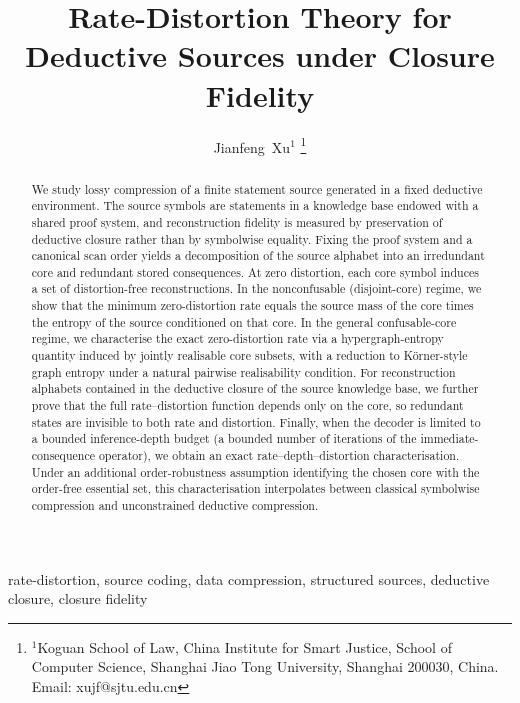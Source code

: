 \documentclass[journal,onecolumn]{IEEEtran}
\numberwithin{equation}{section}
\begin{document}
\title{Rate-Distortion Theory for Deductive Sources under Closure Fidelity}

\author{Jianfeng~Xu$^{1}$%
\thanks{$^{1}$Koguan School of Law, China Institute for Smart Justice,
School of Computer Science, Shanghai Jiao Tong University,
Shanghai 200030, China. Email: xujf@sjtu.edu.cn}%
}

\maketitle

\begin{abstract}
We study lossy compression of a finite statement source generated in a fixed deductive environment.
The source symbols are statements in a knowledge base endowed with a shared proof system, and reconstruction fidelity is measured by preservation of deductive closure rather than by symbolwise equality.
Fixing the proof system and a canonical scan order yields a decomposition of the source alphabet into an irredundant core and redundant stored consequences.
At zero distortion, each core symbol induces a set of distortion-free reconstructions.
In the nonconfusable (disjoint-core) regime, we show that the minimum zero-distortion rate equals the source mass of the core times the entropy of the source conditioned on that core.
In the general confusable-core regime, we characterise the exact zero-distortion rate via a hypergraph-entropy quantity induced by jointly realisable core subsets, with a reduction to K\"orner-style graph entropy under a natural pairwise realisability condition.
For reconstruction alphabets contained in the deductive closure of the source knowledge base, we further prove that the full rate--distortion function depends only on the core, so redundant states are invisible to both rate and distortion.
Finally, when the decoder is limited to a bounded inference-depth budget (a bounded number of iterations of the immediate-consequence operator), we obtain an exact rate--depth--distortion characterisation.
Under an additional order-robustness assumption identifying the chosen core with the order-free essential set, this characterisation interpolates between classical symbolwise compression and unconstrained deductive compression.
\end{abstract}

\begin{IEEEkeywords}
rate-distortion, source coding, data compression, structured sources,
deductive closure, closure fidelity
\end{IEEEkeywords}
\end{document}
